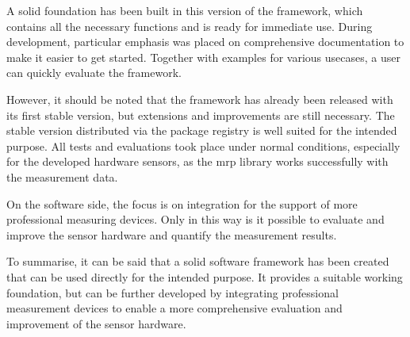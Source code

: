 A solid foundation has been built in this version of the framework,
which contains all the necessary functions and is ready for immediate
use. During development, particular emphasis was placed on comprehensive
documentation to make it easier to get started. Together with examples
for various usecases, a user can quickly evaluate the framework.

However, it should be noted that the framework has already been released
with its first stable version, but extensions and improvements are still
necessary. The stable version distributed via the package registry is
well suited for the intended purpose. All tests and evaluations took
place under normal conditions, especially for the developed hardware
sensors, as the \gls{mrp} library works successfully with the
measurement data.

On the software side, the focus is on integration for the support of
more professional measuring devices. Only in this way is it possible to
evaluate and improve the sensor hardware and quantify the measurement
results.

To summarise, it can be said that a solid software framework has been
created that can be used directly for the intended purpose. It provides
a suitable working foundation, but can be further developed by
integrating professional measurement devices to enable a more
comprehensive evaluation and improvement of the sensor hardware.

